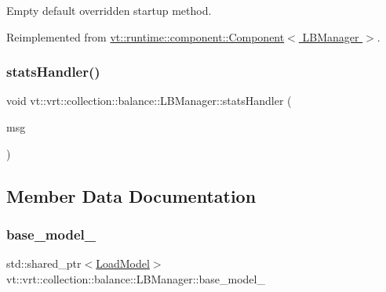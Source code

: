 Empty default overridden startup method. 



Reimplemented from \hyperlink{structvt_1_1runtime_1_1component_1_1_component_aad3974307ab3b2e1df389a91310f68c2}{vt\+::runtime\+::component\+::\+Component$<$ L\+B\+Manager $>$}.

\mbox{\label{structvt_1_1vrt_1_1collection_1_1balance_1_1_l_b_manager_ac068db6bbf9109fc15786b1298279f87}} 
\subsubsection{\texorpdfstring{stats\+Handler()}{statsHandler()}}
{\footnotesize\ttfamily void vt\+::vrt\+::collection\+::balance\+::\+L\+B\+Manager\+::stats\+Handler (\begin{DoxyParamCaption}\item[{\hyperlink{structvt_1_1vrt_1_1collection_1_1balance_1_1_l_b_manager_afedd89b1c2db43f087c1757db6200d36}{Stats\+Msg\+Type} $\ast$}]{msg }\end{DoxyParamCaption})}



\subsection{Member Data Documentation}
\mbox{\label{structvt_1_1vrt_1_1collection_1_1balance_1_1_l_b_manager_ace781095ef59c156a0b23dea6dea70db}} 
\subsubsection{\texorpdfstring{base\+\_\+model\+\_\+}{base\_model\_}}
{\footnotesize\ttfamily std\+::shared\+\_\+ptr$<$\hyperlink{structvt_1_1vrt_1_1collection_1_1balance_1_1_load_model}{Load\+Model}$>$ vt\+::vrt\+::collection\+::balance\+::\+L\+B\+Manager\+::base\+\_\+model\+\_\+\hspace{0.3cm}{\ttfamily [private]}}

